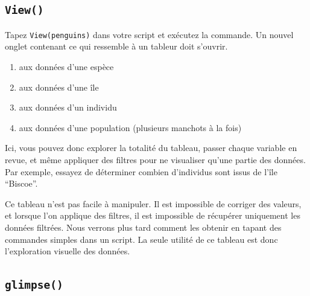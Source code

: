 \documentclass[
  a4paper,
  DIV=11,
  numbers=noendperiod,
  oneside]{scrreprt}
\providecommand{\tightlist}{%
  \setlength{\itemsep}{0pt}\setlength{\parskip}{0pt}}\usepackage{longtable,booktabs,array}
\begin{document}
\subsection{\texorpdfstring{\texttt{View()}}{View()}}\label{sec-View}

Tapez \texttt{View(penguins)} dans votre script et exécutez la commande.
Un nouvel onglet contenant ce qui ressemble à un tableur doit s'ouvrir.

\begin{tcolorbox}[enhanced jigsaw, coltitle=black, toprule=.15mm, opacityback=0, breakable, colback=white, opacitybacktitle=0.6, colframe=quarto-callout-tip-color-frame, leftrule=.75mm, rightrule=.15mm, titlerule=0mm, bottomtitle=1mm, toptitle=1mm, arc=.35mm, title=\textcolor{quarto-callout-tip-color}{\faLightbulb}\hspace{0.5em}{Quizz : à quoi correspondent chacune des lignes de ce tableau ?}, colbacktitle=quarto-callout-tip-color!10!white, bottomrule=.15mm, left=2mm]

\begin{enumerate}
\def\labelenumi{\alph{enumi}.}
\tightlist
\item
  aux données d'une espèce
\item
  aux données d'une île
\item
  aux données d'un individu
\item
  aux données d'une population (plusieurs manchots à la fois)
\end{enumerate}

\end{tcolorbox}

Ici, vous pouvez donc explorer la totalité du tableau, passer chaque
variable en revue, et même appliquer des filtres pour ne visualiser
qu'une partie des données. Par exemple, essayez de déterminer combien
d'individus sont issus de l'île ``Biscoe''.

Ce tableau n'est pas facile à manipuler. Il est impossible de corriger
des valeurs, et lorsque l'on applique des filtres, il est impossible de
récupérer uniquement les données filtrées. Nous verrons plus tard
comment les obtenir en tapant des commandes simples dans un script. La
seule utilité de ce tableau est donc l'exploration visuelle des données.

\subsection{\texorpdfstring{\texttt{glimpse()}}{glimpse()}}\label{glimpse}
\end{document}
